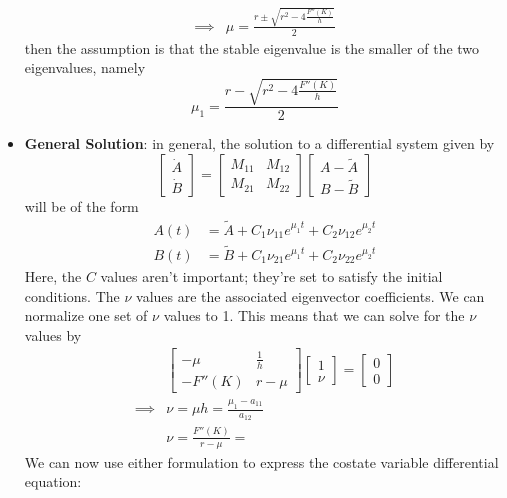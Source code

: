 \documentclass[12pt]{article}
\begin{document}
\begin{itemize}
\[\begin{split}
        \implies &\mu = \frac{r \pm \sqrt{r^2 - 4\frac{F''(K)}{h}}}{2}
        \end{split}\]
    then the assumption is that the stable eigenvalue is the smaller of the two eigenvalues, namely
    \[\mu_1 = \frac{r - \sqrt{r^2 - 4\frac{F''(K)}{h}}}{2}\]
    \item \textbf{General Solution}: in general, the solution to a differential system given by
    \[\begin{bmatrix}
    \dot{A} \\
    \dot{B}
    \end{bmatrix} = \begin{bmatrix}
    M_{11} & M_{12} \\
    M_{21} & M_{22}
    \end{bmatrix} \begin{bmatrix}
    A - \widetilde{A} \\
    B - \widetilde{B}
    \end{bmatrix}\]
    will be of the form
    \[\begin{split}
        A(t) &= \widetilde{A} + C_{1}\nu_{11}e^{\mu_1 t} + C_2\nu_{12}e^{\mu_2t} \\
        B(t) &= \widetilde{B} + C_1 \nu_{21}e^{\mu_1t} + C_2\nu_{22}e^{\mu_2t}
    \end{split}\]
    Here, the $C$ values aren't important; they're set to satisfy the initial conditions. The $\nu$ values are the associated eigenvector coefficients. We can normalize one set of $\nu$ values to 1. This means that we can solve for the $\nu$ values by
    \[\begin{split}
        &\begin{bmatrix}
        -\mu & \frac{1}{h} \\
         - F''(K) & r-\mu
        \end{bmatrix}\begin{bmatrix}
        1 \\
        \nu
        \end{bmatrix} = \begin{bmatrix}
        0 \\
        0
        \end{bmatrix} \\
        \implies &\nu = \mu h = \frac{\mu_1 - a_{11}}{a_{12}}\\
        &\nu = \frac{F''(K)}{r-\mu} = 
    \end{split}\]
    We can now use either formulation to express the costate variable differential equation:

\end{itemize}
\end{document}
